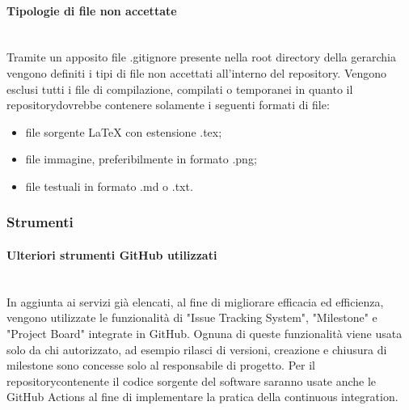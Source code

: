 	\paragraph{Tipologie di file non accettate}\mbox{}\\ [1mm]
		Tramite un apposito file .gitignore presente nella root directory della gerarchia vengono definiti i tipi di file non accettati all'interno del repository\glo. Vengono esclusi tutti i file di compilazione, compilati o temporanei in quanto il repository\glosp dovrebbe contenere solamente i seguenti formati di file:
		\begin{itemize}
			\item file sorgente \LaTeX \xspace con estensione .tex;
			\item file immagine, preferibilmente in formato .png;
			\item file testuali in formato .md o .txt.			
		\end{itemize}
	\subsubsection{Strumenti}
	\paragraph{Ulteriori strumenti GitHub utilizzati}\mbox{}\\ [1mm]
		In aggiunta ai servizi già elencati, al fine di migliorare efficacia ed efficienza, vengono utilizzate le funzionalità di "Issue Tracking System",
		"Milestone" e "Project Board" integrate in GitHub. Ognuna di queste funzionalità viene usata solo da chi autorizzato, ad esempio rilasci di versioni, creazione e chiusura di milestone sono concesse solo al responsabile di progetto\glo.
		\newline
		Per il repository\glosp contenente il codice sorgente del software saranno usate anche le GitHub Actions al fine di implementare la pratica della continuous integration.
		
